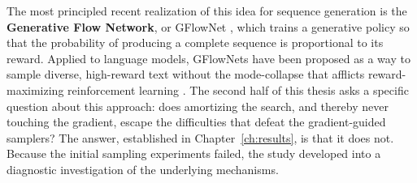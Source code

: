 The most principled recent realization of this idea for sequence generation is the \textbf{Generative Flow Network}, or GFlowNet \citep{bengio2021flow, bengio2023gflownet}, which trains a generative policy so that the probability of producing a complete sequence is proportional to its reward. Applied to language models, GFlowNets have been proposed as a way to sample diverse, high-reward text without the mode-collapse that afflicts reward-maximizing reinforcement learning \citep{hu2024amortizing}. The second half of this thesis asks a specific question about this approach: does amortizing the search, and thereby never touching the gradient, escape the difficulties that defeat the gradient-guided samplers? The answer, established in Chapter~\ref{ch:results}, is that it does not. Because the initial sampling experiments failed, the study developed into a diagnostic investigation of the underlying mechanisms.
%
%

